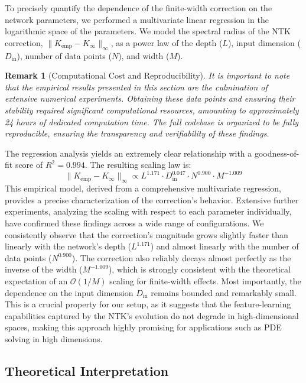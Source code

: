 \documentclass{article}
\newtheorem{remark}[theorem]{Remark}
\begin{document}
To precisely quantify the dependence of the finite-width correction on the network parameters, we performed a multivariate linear regression in the logarithmic space of the parameters. We model the spectral radius of the NTK correction, $\|K_{\text{emp}} - K_{\infty}\|_\infty$, as a power law of the depth ($L$), input dimension ($D_{\text{in}}$), number of data points ($N$), and width ($M$).

\begin{remark}[Computational Cost and Reproducibility]
It is important to note that the empirical results presented in this section are the culmination of extensive numerical experiments. Obtaining these data points and ensuring their stability required significant computational resources, amounting to approximately 24 hours of dedicated computation time. The full codebase is organized to be fully reproducible, ensuring the transparency and verifiability of these findings.
\end{remark}

The regression analysis yields an extremely clear relationship with a goodness-of-fit score of $R^2 = 0.994$. The resulting scaling law is:
\begin{equation}
    \|K_{\text{emp}} - K_{\infty}\|_\infty \propto L^{1.171} \cdot D_{\text{in}}^{0.047} \cdot N^{0.900} \cdot M^{-1.009}
    \label{eq:scaling_law}
\end{equation}
This empirical model, derived from a comprehensive multivariate regression, provides a precise characterization of the correction's behavior. Extensive further experiments, analyzing the scaling with respect to each parameter individually, have confirmed these findings across a wide range of configurations. We consistently observe that the correction's magnitude grows slightly faster than linearly with the network's depth ($L^{1.171}$) and almost linearly with the number of data points ($N^{0.900}$). The correction also reliably decays almost perfectly as the inverse of the width ($M^{-1.009}$), which is strongly consistent with the theoretical expectation of an $\mathcal{O}(1/M)$ scaling for finite-width effects. Most importantly, the dependence on the input dimension $D_{\text{in}}$ remains bounded and remarkably small. This is a crucial property for our setup, as it suggests that the feature-learning capabilities captured by the NTK's evolution do not degrade in high-dimensional spaces, making this approach highly promising for applications such as PDE solving in high dimensions.

\subsection{Theoretical Interpretation}
\end{document}
